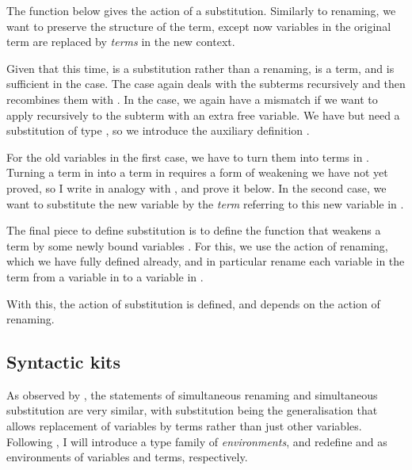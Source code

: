 \Sub{}

The  function below gives the action of a substitution.
Similarly to renaming, we want to preserve the structure of the term, except
now variables in the original term are replaced by \emph{terms} in the new
context.

\substitute{}

Given that this time, \AgdaBound{$\rho$} is a substitution rather than a
renaming, \AgdaBound{$\rho$}  is a term, and is sufficient in the
 case.
The  case again deals with the subterms
recursively and then recombines them with .
In the  case, we again have a mismatch if we
want to apply  recursively to the subterm  with
an extra free variable.
We have \AgdaBound{$\rho$} \AgdaSymbol{:} \SubGD{} but need a substitution of
type \SubGADA{}, so we introduce the auxiliary definition
.

\bindSub{}

For the old variables in the first case, we have \AgdaBound{$\rho$} to turn
them into terms in \AgdaBound{$\Gamma$}.
Turning a term in \AgdaBound{$\Gamma$} into a term in \GTh{} requires a form
of weakening we have not yet proved, so I write  in analogy
with , and prove it below.
In the second case, we want to substitute the new variable by the \emph{term}
referring to this new variable in \GTh{}.

The final piece to define substitution is to define the function that weakens
a term by some newly bound variables \AgdaBound{$\Delta$}.
For this, we use the action of renaming, which we have fully defined already,
and in particular rename each variable in the term from a variable in
\AgdaBound{$\Gamma$} to a variable in \GD{}.

\leftTerm{}

With this, the action of substitution is defined, and depends on the action
of renaming.

\subsection{Syntactic kits}\label{sec:syntactic-kits}

As observed by \citet{McBride05,BHKM12},
the statements of simultaneous renaming and simultaneous substitution are
very similar, with substitution being the generalisation that allows
replacement of variables by terms rather than just other variables.
Following \citet{McBride05},
I will introduce a type family  of \emph{environments}, and
redefine  and  as environments of
variables and terms, respectively.

